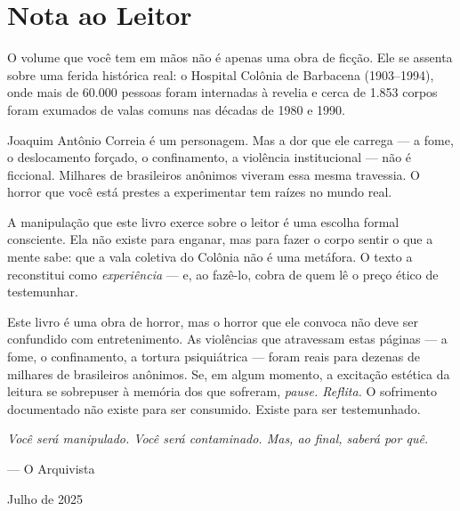 \cleardoublepage
\thispagestyle{empty}
\chapter*{Nota ao Leitor}

\begingroup

O volume que você tem em mãos não é apenas uma obra de ficção. Ele se assenta sobre uma ferida histórica real: o Hospital Colônia de Barbacena (1903--1994), onde mais de 60.000 pessoas foram internadas à revelia e cerca de 1.853 corpos foram exumados de valas comuns nas décadas de 1980 e 1990.

\vspace{0.6em}

Joaquim Antônio Correia é um personagem. Mas a dor que ele carrega — a fome, o deslocamento forçado, o confinamento, a violência institucional — não é ficcional. Milhares de brasileiros anônimos viveram essa mesma travessia. O horror que você está prestes a experimentar tem raízes no mundo real.

\vspace{0.6em}

A manipulação que este livro exerce sobre o leitor é uma escolha formal consciente. Ela não existe para enganar, mas para fazer o corpo sentir o que a mente sabe: que a vala coletiva do Colônia não é uma metáfora. O texto a reconstitui como \textit{experiência} — e, ao fazê-lo, cobra de quem lê o preço ético de testemunhar.

\vspace{0.6em}

Este livro é uma obra de horror, mas o horror que ele convoca não deve ser confundido com entretenimento. As violências que atravessam estas páginas — a fome, o confinamento, a tortura psiquiátrica — foram reais para dezenas de milhares de brasileiros anônimos. Se, em algum momento, a excitação estética da leitura se sobrepuser à memória dos que sofreram, {\itshape pause. Reflita.} O sofrimento documentado não existe para ser consumido. Existe para ser testemunhado.

\vspace{0.6em}

{\itshape Você será manipulado. Você será contaminado. Mas, ao final, saberá por quê.}

\vspace{1.2em}

\begin{flushright}
--- O Arquivista\par
Julho de 2025
\end{flushright}

\endgroup
\clearpage
